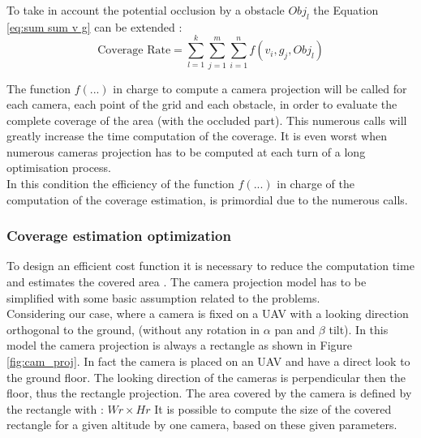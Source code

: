 To take in account the potential occlusion by a obstacle $Obj_l$ the Equation \ref{eq:sum sum v g} can be extended : 
	\begin{equation}
		 \mbox{Coverage Rate}=\sum_{l=1}^{k}\sum_{j=1}^{m}\sum_{i=1}^{n}f( v_i,g_j,Obj_l)
	\end{equation} 
 
The function $f(...)$ in charge to compute a camera projection will be called for each camera, each point of the grid and each obstacle, in order to evaluate the complete coverage of the area (with the occluded part). This numerous calls will greatly increase the time computation of the coverage. It is even worst when numerous cameras projection has to be computed at each turn of a long optimisation process.\\
In this condition the efficiency of the function $f(...)$ in charge of the computation of the coverage estimation, is primordial due to the numerous calls. 


\subsubsection{Coverage estimation optimization} \label{sec:coverageEstimation}
To design an efficient cost function it is necessary to reduce the  computation time and estimates the covered area . %
  The camera projection model has to be simplified with some basic assumption related to the problems.\\
Considering our case, where a camera is fixed on a UAV with a looking direction orthogonal to the ground, (without any rotation in $\alpha$ pan and $\beta$ tilt). 
In this model the camera projection is always a rectangle as shown in Figure \ref{fig:cam_proj}. In fact the camera is  placed on an UAV and have a direct look to the ground floor. The looking direction of the cameras is  perpendicular then the floor, thus the rectangle projection.
The area covered  by the camera is defined by the rectangle with : $Wr\times Hr$ 
It is possible to compute the size of the covered rectangle for a given altitude by one camera, based on these given parameters. 

